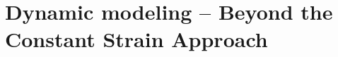 \chapter[Dynamic modeling of soft robots -- Beyond PCC]{Dynamic modeling -- Beyond the Constant Strain Approach}
\label{chap: chapter 3}


%

%

%
